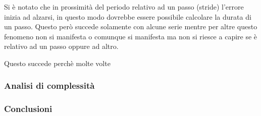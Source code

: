 Si è notato che in prossimità del periodo relativo ad un passo (stride) l'errore inizia ad alzarsi,
in questo modo dovrebbe essere possibile calcolare la durata di un passo.
Questo però succede solamente con alcune serie mentre per altre questo fenomeno non si manifesta o comunque
si manifesta ma non si riesce a capire se è relativo ad un passo oppure ad altro.

Questo succede perchè molte volte


\subsubsection{Analisi di complessità}
\subsubsection{Conclusioni}